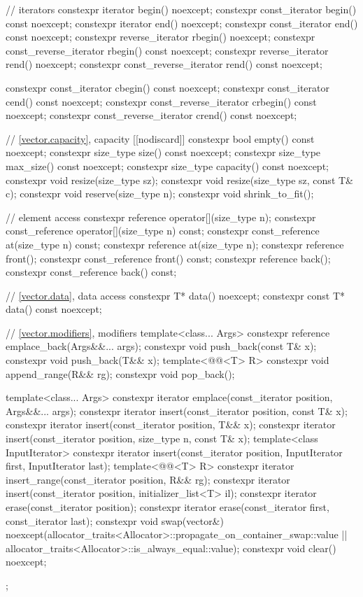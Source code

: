 \begin{codeblock}
{{    // iterators
    constexpr iterator               begin() noexcept;
    constexpr const_iterator         begin() const noexcept;
    constexpr iterator               end() noexcept;
    constexpr const_iterator         end() const noexcept;
    constexpr reverse_iterator       rbegin() noexcept;
    constexpr const_reverse_iterator rbegin() const noexcept;
    constexpr reverse_iterator       rend() noexcept;
    constexpr const_reverse_iterator rend() const noexcept;

    constexpr const_iterator         cbegin() const noexcept;
    constexpr const_iterator         cend() const noexcept;
    constexpr const_reverse_iterator crbegin() const noexcept;
    constexpr const_reverse_iterator crend() const noexcept;

    // \ref{vector.capacity}, capacity
    [[nodiscard]] constexpr bool empty() const noexcept;
    constexpr size_type size() const noexcept;
    constexpr size_type max_size() const noexcept;
    constexpr size_type capacity() const noexcept;
    constexpr void      resize(size_type sz);
    constexpr void      resize(size_type sz, const T& c);
    constexpr void      reserve(size_type n);
    constexpr void      shrink_to_fit();

    // element access
    constexpr reference       operator[](size_type n);
    constexpr const_reference operator[](size_type n) const;
    constexpr const_reference at(size_type n) const;
    constexpr reference       at(size_type n);
    constexpr reference       front();
    constexpr const_reference front() const;
    constexpr reference       back();
    constexpr const_reference back() const;

    // \ref{vector.data}, data access
    constexpr T*       data() noexcept;
    constexpr const T* data() const noexcept;

    // \ref{vector.modifiers}, modifiers
    template<class... Args> constexpr reference emplace_back(Args&&... args);
    constexpr void push_back(const T& x);
    constexpr void push_back(T&& x);
    template<@@<T> R>
      constexpr void append_range(R&& rg);
    constexpr void pop_back();

    template<class... Args> constexpr iterator emplace(const_iterator position, Args&&... args);
    constexpr iterator insert(const_iterator position, const T& x);
    constexpr iterator insert(const_iterator position, T&& x);
    constexpr iterator insert(const_iterator position, size_type n, const T& x);
    template<class InputIterator>
      constexpr iterator insert(const_iterator position,
                                InputIterator first, InputIterator last);
    template<@@<T> R>
      constexpr iterator insert_range(const_iterator position, R&& rg);
    constexpr iterator insert(const_iterator position, initializer_list<T> il);
    constexpr iterator erase(const_iterator position);
    constexpr iterator erase(const_iterator first, const_iterator last);
    constexpr void     swap(vector&)
      noexcept(allocator_traits<Allocator>::propagate_on_container_swap::value ||
               allocator_traits<Allocator>::is_always_equal::value);
    constexpr void     clear() noexcept;
  };

}
\end{codeblock}
